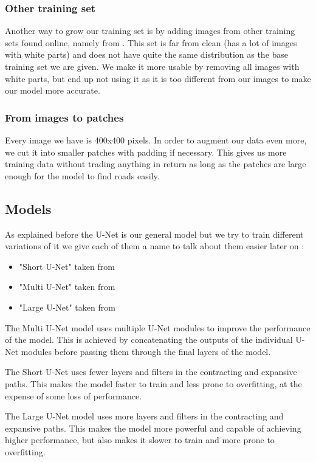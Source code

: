 \documentclass[10pt,conference,compsocconf]{IEEEtran}
\begin{document}
\subsubsection{Other training set}
\label{otherset}
Another way to grow our training set is by adding images from other training sets found online, namely from \cite{newtraining}. This set is far from clean (has a lot of images with white parts) and does not have quite the same distribution as the base training set we are given. We make it more usable by removing all images with white parts, but end up not using it as it is too different from our images to make our model more accurate.
\subsubsection{From images to patches}
Every image we have is 400x400 pixels. In order to augment our data even more, we cut it into smaller patches with padding if necessary. This gives us more training data without trading anything in return as long as the patches are large enough for the model to find roads easily.
\subsection{Models}
\label{models}
As explained before the U-Net is our general model but we try to train different variations of it we give each of them a name to talk about them easier later on :
\begin{itemize}
\item "Short U-Net" taken from \cite{short-unet}
\item "Multi U-Net" taken from \cite{multi-unet}
\item "Large U-Net" taken from \cite{large-unet}
\end{itemize}
The Multi U-Net model uses multiple U-Net modules to improve the performance of the model. This is achieved by concatenating the outputs of the individual U-Net modules before passing them through the final layers of the model.

The Short U-Net uses fewer layers and filters in the contracting and expansive paths. This makes the model faster to train and less prone to overfitting, at the expense of some loss of performance.

The Large U-Net model uses more layers and filters in the contracting and expansive paths. This makes the model more powerful and capable of achieving higher performance, but also makes it slower to train and more prone to overfitting.
\end{document}
